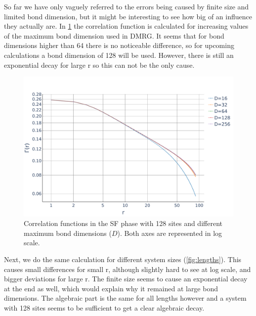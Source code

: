 \documentclass[twoside,twocolumn,9pt]{article}
\begin{document}
So far we have only vaguely referred to the errors being caused by finite size and limited bond dimension, but it might be interesting to see how big of an influence they actually are. 
In \cref{fig:bonds} the correlation function is calculated for increasing values of the maximum bond dimension used in DMRG. It seems that for bond dimensions higher than 64 there is no noticeable difference, so for upcoming calculations a bond dimension of 128 will be used. However, there is still an exponential decay for large r so this can not be the only cause.
\begin{center}
  \begin{figure}
      \includegraphics[width=\linewidth]{../code/figures/Correlations-bonds.pdf}
      \caption{Correlation functions in the SF phase with 128 sites and different maximum bond dimensions ($D$). Both axes are represented in log scale.}
      \label{fig:bonds}
  \end{figure}
\end{center}
Next, we do the same calculation for different system sizes (\cref{fig:lengths}). This causes small differences for small r, although slightly hard to see at log scale, and bigger deviations for large r. The finite size seems to cause an exponential decay at the end as well, which would explain why it remained at large bond dimensions. The algebraic part is the same for all lengths however and a system with 128 sites seems to be sufficient to get a clear algebraic decay.
\end{document}
